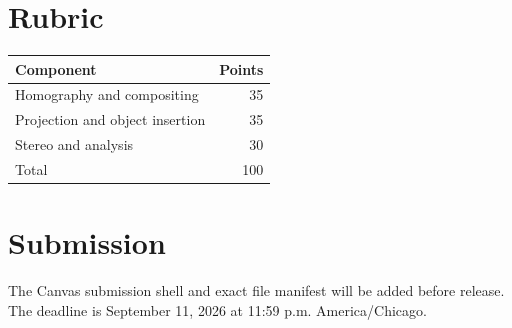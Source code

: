 \documentclass[11pt]{article}
\newcommand{\DueDate}{September 11, 2026 at 11:59 p.m. America/Chicago}
\begin{document}
\section{Rubric}
\begin{center}
\begin{tabular}{lr}
\toprule
Component & Points \\
\midrule
Homography and compositing & 35 \\
Projection and object insertion & 35 \\
Stereo and analysis & 30 \\
\midrule
Total & 100 \\
\bottomrule
\end{tabular}
\end{center}

\section{Submission}
The Canvas submission shell and exact file manifest will be added before
release. The deadline is \DueDate.
\end{document}
